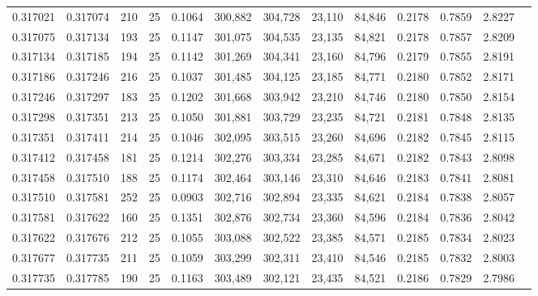 \begin{tabular}{rrrrrrrrrrrrr}
0.317021 & 0.317074 &   210 &  25 &                                     0.1064 & 300,882 & 304,728 &  23,110 &  84,846 & 0.2178 & 0.7859 & 2.8227 \\
0.317075 & 0.317134 &   193 &  25 &                                     0.1147 & 301,075 & 304,535 &  23,135 &  84,821 & 0.2178 & 0.7857 & 2.8209 \\
0.317134 & 0.317185 &   194 &  25 &                                     0.1142 & 301,269 & 304,341 &  23,160 &  84,796 & 0.2179 & 0.7855 & 2.8191 \\
0.317186 & 0.317246 &   216 &  25 &                                     0.1037 & 301,485 & 304,125 &  23,185 &  84,771 & 0.2180 & 0.7852 & 2.8171 \\
0.317246 & 0.317297 &   183 &  25 &                                     0.1202 & 301,668 & 303,942 &  23,210 &  84,746 & 0.2180 & 0.7850 & 2.8154 \\
0.317298 & 0.317351 &   213 &  25 &                                     0.1050 & 301,881 & 303,729 &  23,235 &  84,721 & 0.2181 & 0.7848 & 2.8135 \\
0.317351 & 0.317411 &   214 &  25 &                                     0.1046 & 302,095 & 303,515 &  23,260 &  84,696 & 0.2182 & 0.7845 & 2.8115 \\
0.317412 & 0.317458 &   181 &  25 &                                     0.1214 & 302,276 & 303,334 &  23,285 &  84,671 & 0.2182 & 0.7843 & 2.8098 \\
0.317458 & 0.317510 &   188 &  25 &                                     0.1174 & 302,464 & 303,146 &  23,310 &  84,646 & 0.2183 & 0.7841 & 2.8081 \\
0.317510 & 0.317581 &   252 &  25 &                                     0.0903 & 302,716 & 302,894 &  23,335 &  84,621 & 0.2184 & 0.7838 & 2.8057 \\
0.317581 & 0.317622 &   160 &  25 &                                     0.1351 & 302,876 & 302,734 &  23,360 &  84,596 & 0.2184 & 0.7836 & 2.8042 \\
0.317622 & 0.317676 &   212 &  25 &                                     0.1055 & 303,088 & 302,522 &  23,385 &  84,571 & 0.2185 & 0.7834 & 2.8023 \\
0.317677 & 0.317735 &   211 &  25 &                                     0.1059 & 303,299 & 302,311 &  23,410 &  84,546 & 0.2185 & 0.7832 & 2.8003 \\
0.317735 & 0.317785 &   190 &  25 &                                     0.1163 & 303,489 & 302,121 &  23,435 &  84,521 & 0.2186 & 0.7829 & 2.7986 \\

\end{tabular}
